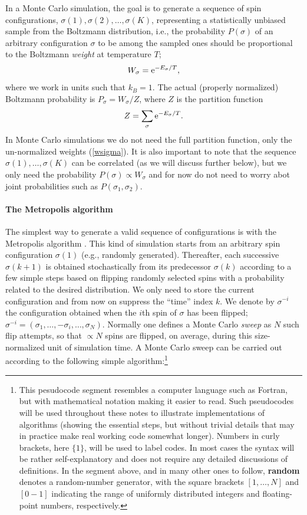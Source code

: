 \documentclass[draft,numberedheadings]{aipproc}
\begin{document}
In a Monte Carlo simulation, the goal is to generate a sequence of spin configurations, $\sigma(1),\sigma(2),\ldots,\sigma(K)$, representing 
a statistically unbiased sample from the Boltzmann distribution, i.e., the probability $P(\sigma)$ of an arbitrary configuration $\sigma$ to be among 
the sampled ones should be proportional to the Boltzmann {\it weight} at temperature $T$;
\begin{equation}
W_\sigma = {\rm e}^{-E_\sigma/T},
\label{wsigma}
\end{equation}
where we work in units such that $k_B=1$. The actual 
(properly normalized) Boltzmann probability is $P_\sigma=W_\sigma/Z$, where $Z$ is the partition function
\begin{equation}
Z = \sum_{\sigma} {\rm e}^{-E_\sigma/T}.
\end{equation}
In Monte Carlo simulations we do not need the full partition function, only the un-normalized weights (\ref{wsigma}). It is also important to note that 
the sequence $\sigma(1),\ldots,\sigma(K)$ can be correlated (as we will discuss further below), but we only need the probability $P(\sigma) \propto W_\sigma$ 
and for now do not need to worry abot joint probabilities such as $P(\sigma_1,\sigma_2)$. 

\paragraph{The Metropolis algorithm}

The simplest way to generate a valid  sequence of configurations is with the Metropolis algorithm \cite{metropolis}. This kind of simulation starts 
from an arbitrary spin configuration $\sigma(1)$ (e.g., randomly generated). Thereafter, each successive $\sigma(k+1)$ is obtained stochastically from its 
predecessor $\sigma(k)$ according to a few simple steps based on flipping randomly selected spins with a probability related to the desired distribution.
We only need to store the current configuration and from now on suppress the ``time'' index $k$. We denote by $\sigma^{-i}$ the configuration obtained 
when the $i$th spin of $\sigma$ has been flipped; $\sigma^{-i}=(\sigma_1,\ldots,-\sigma_i,\ldots,\sigma_N)$. Normally one defines a Monte Carlo {\it sweep} 
as $N$ such flip attempts, so that $\propto N$ spins are flipped, on average, during this size-normalized unit of simulation time. A Monte Carlo sweep 
can be carried out according to the following simple algorithm:\footnote{This pesudocode segment resembles a computer language such as Fortran, but with 
mathematical notation making it easier to read. Such pseudocodes will be used throughout these notes to illustrate implementations of algorithms (showing 
the essential steps, but without trivial details that may in practice make real working code somewhat longer). Numbers in curly brackets, here $\{1\}$, 
will be used to label codes. In most cases the syntax will be rather self-explanatory and does not require any detailed discussions of definitions. In 
the segment above, and in many other ones to follow, {\bf random} denotes a random-number generator, with the square brackets $[1,\ldots,N]$ and $[0-1]$ 
indicating the range of uniformly distributed integers and floating-point numbers, respectively.}
\end{document}
